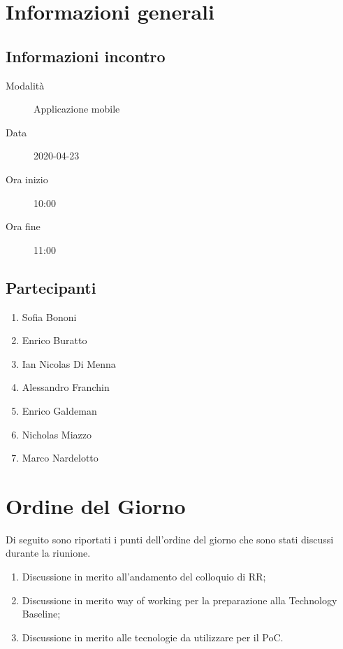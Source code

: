 \documentclass{article}
\begin{document}


\section{Informazioni generali}%
\label{sec:informazioni_generali}

\subsection{Informazioni incontro}%
\label{sub:informazioni_incontro}

\begin{description}
  \item[Modalità] Applicazione mobile 
  \item[Data] 2020-04-23
  \item[Ora inizio] 10:00
  \item[Ora fine] 11:00
\end{description}

\subsection{Partecipanti}%
\label{sub:partecipanti}

\begin{enumerate}
  \item Sofia Bononi
  \item Enrico Buratto
  \item Ian Nicolas Di Menna
  \item Alessandro Franchin
  \item Enrico Galdeman
  \item Nicholas Miazzo
  \item Marco Nardelotto
\end{enumerate}

\section{Ordine del Giorno}%
\label{ordine_del_giorno}
Di seguito sono riportati i punti dell'ordine del giorno che sono stati discussi durante la riunione.
\begin{enumerate}
  \item Discussione in merito all'andamento del colloquio di RR;
  \item Discussione in merito way of working per la preparazione alla Technology Baseline;
  \item Discussione in merito alle tecnologie da utilizzare per il PoC.
\end{enumerate}
\end{document}
